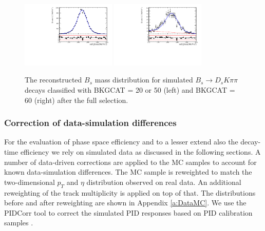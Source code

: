 \begin{figure}[h]
\centering
\includegraphics[height=!,width=0.4\textwidth]{figs/MassFit/signalMC_pull.pdf}
\includegraphics[height=!,width=0.4\textwidth]{figs/MassFit/signalMC_ghost_pull.pdf}


\caption{\small The reconstructed $B_s$ mass distribution for simulated $B_s \to D_s K \pi \pi$  %
decays classified with \textsf{BKGCAT} = 20 or 50 (left) and \textsf{BKGCAT} = 60 (right) after the full selection. }
\label{fig:}
\end{figure}


\subsubsection{Correction of data-simulation differences}

For the evaluation of phase space efficiency and to a lesser extend also the decay-time efficiency we rely on simulated data 
as discussed in the following sections.
A number of data-driven corrections are applied to the MC samples to account for known data-simulation differences.
The MC sample is reweighted to match the two-dimensional $p_T$ and $\eta$ distribution observed on real data.
An additional reweighting of the track multiplicity is applied on top of that.
The distributions before and after reweighting are shown in Appendix \ref{a:DataMC}.
We use the \textsf{PIDCorr} tool to correct the simulated PID responses based on PID calibration samples \cite{LHCb-INT-2017-007}.

